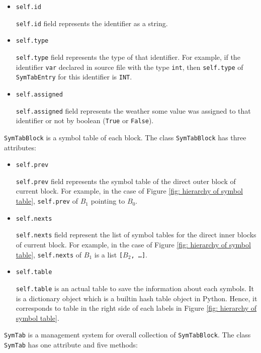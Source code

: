 \documentclass{article}
\newcommand{\code}[1]{\texttt{#1}}
\begin{document}
	\begin{itemize}
		\item \code{self.id}
		
		\code{self.id} field represents the identifier as a string.
		
		\item \code{self.type}
		
		\code{self.type} field represents the type of that identifier. For example, if the identifier \code{var} declared in source file with the type \code{int}, then \code{self.type} of \code{SymTabEntry} for this identifier is \code{INT}.
		
		\item \code{self.assigned}
		
		\code{self.assigned} field represents the weather some value was assigned to that identifier or not by boolean (\code{True} or \code{False}).
	\end{itemize}
	
	\code{SymTabBlock} is a symbol table of each block. The class \code{SymTabBlock} has three attributes:
	
	\begin{itemize}
		\item \code{self.prev}
		
		\code{self.prev} field represents the symbol table of the direct outer block of current block. For example, in the case of Figure \ref{fig: hierarchy of symbol table}, \code{self.prev} of $B_1$ pointing to $B_0$.
		
		\item \code{self.nexts}
		
		\code{self.nexts} field represent the list of symbol tables for the direct inner blocks of current block. For example, in the case of Figure \ref{fig: hierarchy of symbol table}, \code{self.nexts} of $B_1$ is a list \code{[$B_2$, \dots]}.
		
		\item \code{self.table}
		
		\code{self.table} is an actual table to save the information about each symbols. It is a dictionary object which is a builtin hash table object in Python. Hence, it corresponds to table in the right side of each labels in Figure \ref{fig: hierarchy of symbol table}.
	\end{itemize}
	
	\code{SymTab} is a management system for overall collection of \code{SymTabBlock}. The class \code{SymTab} has one attribute and five methods:
	
\end{document}
